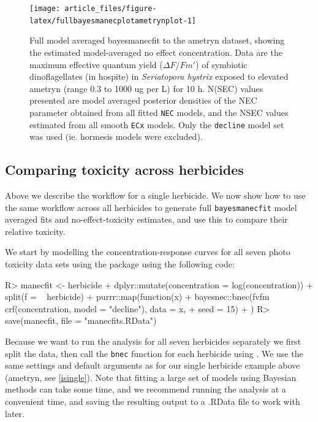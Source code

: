 \documentclass[
  shortnames]{jss}
\begin{document}
\begin{CodeChunk}
\begin{figure}[!ht]

{\centering \texttt{[image: article\_files/figure-latex/fullbayesmanecplotametrynplot-1]} 

}

\caption{Full model averaged bayesmanecfit to the ametryn dataset, showing the estimated model-averaged no effect concentration. Data are the maximum effective quantum yield ($\Delta F / Fm'$) of symbiotic dinoflagellates (in hospite) in \textit{Seriatopora hystrix} exposed to elevated ametryn (range 0.3 to 1000 ug per L) for 10 h. N(SEC) values presented are model averaged posterior densities of the NEC parameter obtained from all fitted \texttt{NEC} models, and the NSEC values estimated from all smooth \texttt{ECx} models. Only the \texttt{decline} model set was used (ie. hormesis models were excluded).}\label{fig:fullbayesmanecplotametrynplot}
\end{figure}
\end{CodeChunk}

\subsection[Comparing toxicity]{Comparing toxicity across herbicides}\label{iall}

Above we describe the workflow for a single herbicide. We now show how to use the same workflow across all herbicides to generate full \texttt{bayesmanecfit} model averaged fits and no-effect-toxicity estimates, and use this to compare their relative toxicity.

We start by modelling the concentration-response curves for all seven photo toxicity data sets using the  package using the following code:

\begin{CodeChunk}
\begin{CodeInput}
R> manecfit <- herbicide %
+   dplyr::mutate(concentration = log(concentration)) %
+   split(f = ~ herbicide) %
+   purrr::map(function(x) {
+     bayesnec::bnec(fvfm ~ crf(concentration, model = "decline"), data = x,
+                    seed = 15)
+   })
R> save(manecfit, file = "manecfits.RData")
\end{CodeInput}
\end{CodeChunk}

Because we want to run the analysis for all seven herbicides separately we first split the data, then call the \texttt{bnec} function for each herbicide using  \citep{purrr}. We use the same settings and default arguments as for our single herbicide example above (ametryn, see \ref{isingle}). Note that fitting a large set of models using Bayesian methods can take some time, and we recommend running the analysis at a convenient time, and saving the resulting output to a .RData file to work with later.
\end{document}
